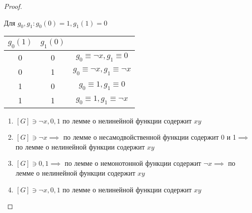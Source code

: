 \documentclass[a4paper]{article}
\theoremstyle{definition}
\theoremstyle{remark}
\begin{document}
\begin{proof}
\begin{itemize}
            Для $g_0, g_1: g_0(0) = 1, g_1(1) = 0$
            \begin{tabular}{c|c|c}
                $g_0(1)$ & $g_1(0)$ & \\
                \hline
                0 & 0 & $g_0 \equiv \neg x, g_1 \equiv 0$\\
                0 & 1 & $g_0 \equiv \neg x, g_1 \equiv \neg x$\\
                1 & 0 & $g_0 \equiv 1, g_1 \equiv 0$\\
                1 & 1 & $g_0 \equiv 1, g_1 \equiv \neg x$\\
            \end{tabular}
            \begin{enumerate}
                \item $[G]\ni \neg x, 0, 1$ по лемме о нелинейной функции
                содержит $xy$
                \item $[G]\ni \neg x\implies$ по лемме о несамодвойственной функции содержит 0 и 1$\implies$
                по лемме о нелинейной функции содержит $xy$
                \item $[G]\ni 0, 1\implies$ по лемме о немонотонной функции содержит $\neg x\implies$
                по лемме о нелинейной функции содержит $xy$
                \item $[G]\ni \neg x, 0, 1$ по лемме о нелинейной функции
                содержит $xy$
            \end{enumerate}
        \end{itemize}
    \end{proof}
\end{document}
